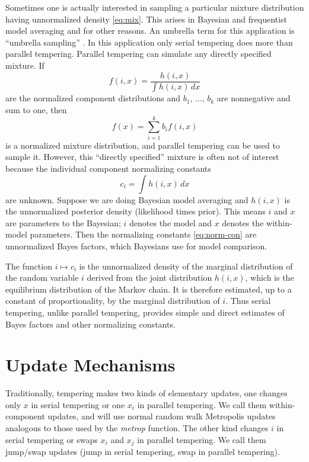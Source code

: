 \documentclass[11pt]{article}
\begin{document}
Sometimes one is actually interested in sampling a particular mixture
distribution having unnormalized density \eqref{eq:mix}.  This arises
in Bayesian and frequentist model averaging and for other reasons.
An umbrella term for this application is ``umbrella sampling''
\citep{torrie-valleau}.  In this application only serial tempering does more
than parallel tempering.  Parallel tempering can simulate any directly
specified mixture.  If
$$
   f(i, x) = \frac{h(i, x)}{\int h(i, x) \, d x}
$$
are the normalized component distributions and $b_1$, $\dots$, $b_k$ are
nonnegative and sum to one, then
$$
   f(x) = \sum_{i = 1}^k b_i f(i, x)
$$
is a normalized mixture distribution, and parallel tempering can be used
to sample it.  However, this ``directly specified'' mixture is often not
of interest because the individual component normalizing constants
\begin{equation} \label{eq:norm-con}
   c_i = \int h(i, x) \, d x
\end{equation}
are unknown.  Suppose we are doing Bayesian model
averaging and $h(i, x)$ is the unnormalized posterior density (likelihood times
prior).  This means $i$ and $x$ are parameters to the Bayesian; $i$ denotes
the model and $x$ denotes the within-model parameters.  Then the normalizing
constants \eqref{eq:norm-con} are unnormalized Bayes factors, which Bayesians
use for model comparison.

The function $i \mapsto c_i$ is the unnormalized density of the marginal
distribution of the random
variable $i$ derived from the joint distribution $h(i, x)$, which is the
equilibrium distribution of the Markov chain.  It is therefore estimated,
up to a constant of proportionality, by the marginal distribution of $i$.
Thus serial tempering, unlike parallel tempering, provides simple and direct
estimates of Bayes factors and other normalizing constants.

\section{Update Mechanisms}

Traditionally, tempering makes two kinds of elementary updates, one changes
only $x$ in serial tempering or one $x_i$ in parallel tempering.  We call
them within-component updates, and will use normal random walk Metropolis
updates analogous to those used by the \emph{metrop} function.  The other
kind changes $i$ in serial tempering or swaps $x_i$ and $x_j$ in parallel
tempering.  We call them jump/swap updates (jump in serial tempering, swap
in parallel tempering).
\end{document}
